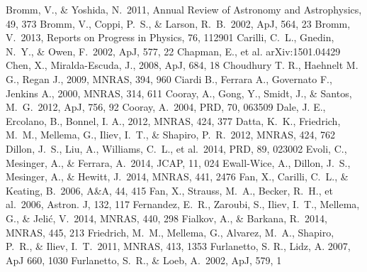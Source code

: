 \begin{thebibliography}{99}
\begin{multicols}{2}
{ Bromm, V., \& Yoshida, N.\ 2011, Annual Review of Astronomy and Astrophysics, 49, 373 
 Bromm, V., Coppi, P.~S., \& Larson, R.~B.\ 2002, ApJ, 564, 23 
 Bromm, V.\ 2013, Reports on Progress in Physics, 76, 112901 
 Carilli, C.~L., Gnedin, N.~Y., \& Owen, F.\ 2002, ApJ, 577, 22 
 Chapman, E., et al. arXiv:1501.04429
 Chen, X., Miralda-Escuda, J., 2008, ApJ, 684, 18
Choudhury T. R., Haehnelt M. G., Regan J., 2009, MNRAS, 394, 960
 Ciardi B., Ferrara A., Governato F., Jenkins A., 2000, MNRAS, 314, 611
 Cooray, A., Gong, Y., Smidt, J., \& Santos, M.~G.\ 2012, ApJ, 756, 92 
 Cooray, A.\ 2004, PRD, 70, 063509 
 Dale, J. E., Ercolano, B., Bonnel, I. A., 2012, MNRAS, 424, 377
 Datta, K.~K., Friedrich, M.~M., Mellema, G., Iliev, I.~T., \& Shapiro, P.~R.\ 2012, MNRAS, 424, 762 
 Dillon, J.~S., Liu, A., Williams, C.~L., et al.\ 2014, PRD, 89, 023002 
 Evoli, C., Mesinger, A., \& Ferrara, A.\ 2014, JCAP, 11, 024 
 Ewall-Wice, A., Dillon, J.~S., Mesinger, A., \& Hewitt, J.\ 2014, MNRAS, 441, 2476
 Fan, X., Carilli, C.~L.,
 \& Keating, B.\ 2006, A\&A, 44, 415
 Fan, X., Strauss, M.~A., 
Becker, R.~H., et al.\ 2006, Astron. J, 132, 117
 Fernandez, E.~R., Zaroubi, S., Iliev, I.~T., Mellema, G., \& Jeli{\'c}, V.\ 2014, MNRAS, 440, 298 
 Fialkov, A., \& Barkana, R.\ 2014, MNRAS, 445, 213 
 Friedrich, M.~M., Mellema, G., Alvarez, M.~A., Shapiro, P.~R., \& Iliev, I.~T.\ 2011, MNRAS, 413, 1353 
  Furlanetto, S. R., Lidz, A. 2007, ApJ 660, 1030
 Furlanetto, S.~R., \& Loeb, A.\ 2002, ApJ, 579, 1 
}
\end{multicols}
\end{thebibliography}
